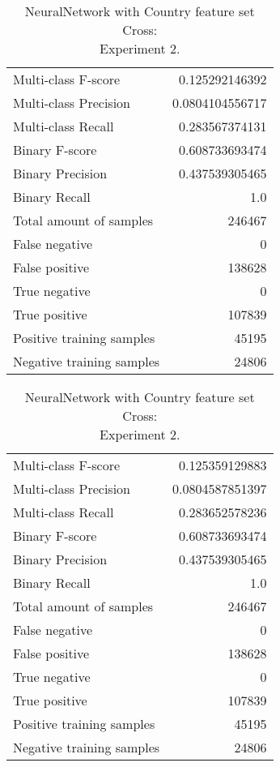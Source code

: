 \begin{table}[H]
\begin{minipage}{0.5\textwidth}
\caption{NeuralNetwork with Country feature set Cross: \\Experiment 1.}
\centering
\begin{tabular}{l r}
\toprule
Multi-class F-score & 0.125292146392 \\
Multi-class Precision & 0.0804104556717 \\
Multi-class Recall & 0.283567374131 \\
\midrule
Binary F-score & 0.608733693474 \\
Binary Precision & 0.437539305465 \\
Binary Recall & 1.0 \\
\midrule
Total amount of samples & 246467 \\
False negative & 0 \\
False positive & 138628 \\
True negative & 0 \\
True positive & 107839 \\
\midrule
Positive training samples & 45195 \\
Negative training samples & 24806 \\
\bottomrule
\end{tabular}
\end{minipage}
\hfillx
\begin{minipage}{0.5\textwidth}
\caption{NeuralNetwork with Country feature set Cross: \\Experiment 2.}
\centering
\begin{tabular}{l r}
\toprule
Multi-class F-score & 0.125359129883 \\
Multi-class Precision & 0.0804587851397 \\
Multi-class Recall & 0.283652578236 \\
\midrule
Binary F-score & 0.608733693474 \\
Binary Precision & 0.437539305465 \\
Binary Recall & 1.0 \\
\midrule
Total amount of samples & 246467 \\
False negative & 0 \\
False positive & 138628 \\
True negative & 0 \\
True positive & 107839 \\
\midrule
Positive training samples & 45195 \\
Negative training samples & 24806 \\
\bottomrule
\end{tabular}
\end{minipage}
\end{table}
